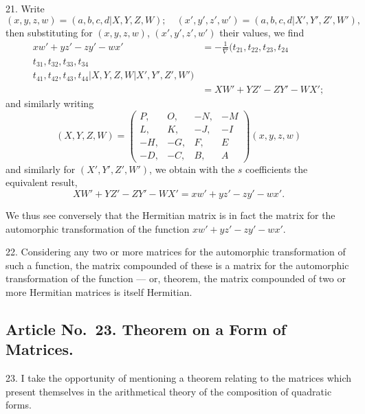 \documentclass[11pt,a4paper]{article}
\theoremstyle{plain}
\begin{document}
21. Write
\[
(x,y,z,w) = (a,b,c,d  |  X,Y,Z,W); \quad (x',y',z',w') = (a,b,c,d  |  X',Y',Z',W'),
\]
then substituting for $(x,y,z,w)$, $(x',y',z',w')$ their values, we find
\begin{align*}
xw' + yz' - zy' - wx' &= -\frac{1}{\nabla}(t_{21}, t_{22}, t_{23}, t_{24} \\ t_{31}, t_{32}, t_{33}, t_{34} \\ t_{41}, t_{42}, t_{43}, t_{44}  |  X,Y,Z,W  |  X',Y',Z',W') \\
&= XW' + YZ' - ZY' - WX';
\end{align*}
and similarly writing
\[
(X,Y,Z,W) =
\begin{pmatrix}
P, & O, & -N, & -M \\
L, & K, & -J, & -I \\
-H, & -G, & F, & E \\
-D, & -C, & B, & A
\end{pmatrix}
(x,y,z,w)
\]
and similarly for $(X',Y',Z',W')$, we obtain with the $s$ coefficients the equivalent result,
\[
XW' + YZ' - ZY' - WX' = xw' + yz' - zy' - wx'.
\]

We thus see conversely that the Hermitian matrix is in fact the matrix for the automorphic transformation of the function $xw' + yz' - zy' - wx'$.

22. Considering any two or more matrices for the automorphic transformation of such a function, the matrix compounded of these is a matrix for the automorphic transformation of the function --- or, theorem, the matrix compounded of two or more Hermitian matrices is itself Hermitian.

\subsection*{Article No.~23. Theorem on a Form of Matrices.}

23. I take the opportunity of mentioning a theorem relating to the matrices which present themselves in the arithmetical theory of the composition of quadratic forms.
\end{document}
